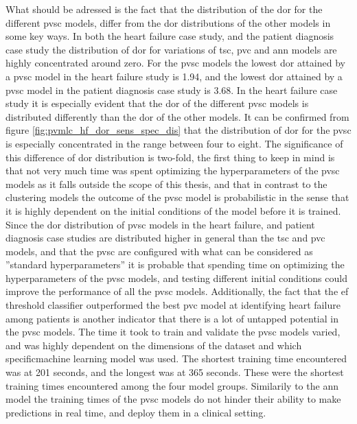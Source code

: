 What should be adressed is the fact that the distribution of the \acrshort{dor} for the different \acrshort{pvsc} models, differ from the \acrshort{dor} distributions of the other models in some key ways. In both the heart failure case study, and the patient diagnosis case study the distribution of \acrshort{dor} for variations of \acrshort{tsc}, \acrshort{pvc} and \acrshort{ann} models are highly concentrated around zero. For the \acrshort{pvsc} models the lowest \acrshort{dor} attained by a \acrshort{pvsc} model in the heart failure study is 1.94, and the lowest \acrshort{dor} attained by a \acrshort{pvsc} model in the patient diagnosis case study is 3.68. In the heart failure case study it is especially evident that the \acrshort{dor} of the different \acrshort{pvsc} models is distributed differently than the \acrshort{dor} of the other models. It can be confirmed from figure \ref{fig:pvmlc_hf_dor_sens_spec_dis} that the distribution of \acrshort{dor} for the \acrshort{pvsc} is especially concentrated in the range between four to eight. The significance of this difference of \acrshort{dor} distribution is two-fold, the first thing to keep in mind is that not very much time was spent optimizing the hyperparameters of the \acrshort{pvsc} models as it falls outside the scope of this thesis, and that in contrast to the clustering models the outcome of the \acrshort{pvsc} model is probabilistic in the sense that it is highly dependent on the initial conditions of the model before it is trained. Since the \acrshort{dor} distribution of \acrshort{pvsc} models in the heart failure, and patient diagnosis case studies are distributed higher in general than the \acrshort{tsc} and \acrshort{pvc} models, and that the \acrshort{pvsc} are configured with what can be considered as ''standard hyperparameters'' it is probable that spending time on optimizing the hyperparameters of the \acrshort{pvsc} models, and testing different initial conditions could improve the performance of all the \acrshort{pvsc} models. Additionally, the fact that the \acrshort{ef} threshold classifier outperformed the best \acrshort{pvc} model at identifying heart failure among patients is another indicator that there is a lot of untapped potential in the \acrshort{pvsc} models. \bigskip
The time it took to train and validate the \acrshort{pvsc} models varied, and was highly dependent on the dimensions of the dataset and which specificmachine learning model was used. The shortest training time encountered was at 201 seconds, and the longest was at 365 seconds. These were the shortest training times encountered among the four model groups. Similarily to the \acrshort{ann} model the training times of the \acrshort{pvsc} models do not hinder their ability to make predictions in real time, and deploy them in a clinical setting.
